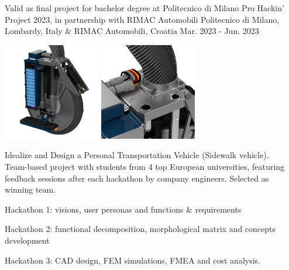 \begin{cventries}
    \cventry
    {Valid as final project for bachelor degree at Politecnico di Milano} %
    {Pro Hackin' Project 2023, in partnership with RIMAC Automobili} %
    {Politecnico di Milano, Lombardy, Italy \& RIMAC Automobili, Croatia} %
    {Mar. 2023 - Jun. 2023} %
    {
        \begin{minipage}{0.72\textwidth}
            \vspace{5pt}
            \begin{center}
                \includegraphics[height=120pt]{img/Rimac/1.jpg}
                \hspace{2cm}
                \includegraphics[height=120pt]{img/Rimac/2.jpg}
            \end{center}
            \vspace{5pt}
            Idealize and Design a Personal Transportation Vehicle (Sidewalk vehicle).\\
            Team-based project with students from 4 top European universities, featuring feedback sessions after each hackathon by company engineers. Selected as winning team.\\
            \begin{cvitems}
                \item {Hackathon 1: visions, user personas and functions \& requirements}
                \item {Hackathon 2: functional decomposition, morphological matrix and concepts development}
                \item {Hackathon 3: CAD design, FEM simulations, FMEA and cost analysis.}

\end{cvitems}
\end{minipage}}
\end{cventries}
